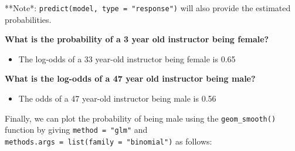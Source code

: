 \documentclass[]{article}
\newenvironment{Shaded}{\begin{snugshade}}{\end{snugshade}}
\newcommand{\KeywordTok}[1]{\textcolor[rgb]{0.13,0.29,0.53}{\textbf{#1}}}
\newcommand{\DecValTok}[1]{\textcolor[rgb]{0.00,0.00,0.81}{#1}}
\newcommand{\StringTok}[1]{\textcolor[rgb]{0.31,0.60,0.02}{#1}}
\newcommand{\OperatorTok}[1]{\textcolor[rgb]{0.81,0.36,0.00}{\textbf{#1}}}
\newcommand{\NormalTok}[1]{#1}
\providecommand{\tightlist}{%
  \setlength{\itemsep}{0pt}\setlength{\parskip}{0pt}}
\begin{document}
**Note*: \texttt{predict(model,\ type\ =\ "response")} will also provide
the estimated probabilities.

\textbf{What is the probability of a 3 year old instructor being
female?}

\begin{Shaded}
\end{Shaded}

\begin{itemize}
\tightlist
\item
  The log-odds of a 33 year-old instructor being female is 0.65
\end{itemize}

\textbf{What is the log-odds of a 47 year old instructor being male?}

\begin{Shaded}
\end{Shaded}

\begin{itemize}
\tightlist
\item
  The odds of a 47 year-old instructor being male is 0.56
\end{itemize}

Finally, we can plot the probability of being male using the
\texttt{geom\_smooth()} function by giving \texttt{method\ =\ "glm"} and
\texttt{methods.args\ =\ list(family\ =\ "binomial")} as follows:
\end{document}
